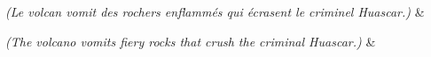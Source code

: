 \documentclass{article}
\newcommand{\stage}[1]{\hfill\emph{(#1)}\hfill}
\begin{document}
\begin{pairs}
\begin{Leftside}
	\stanza
		\stage{Le volcan vomit des rochers enflamm\'{e}s qui \'{e}crasent le criminel Huascar.}
    \& 
    \endnumbering
\end{Leftside}
\begin{Rightside}
	\stanza
		\stage{The volcano vomits fiery rocks that crush the criminal Huascar.}
    \& 
    \endnumbering
\end{Rightside} 
\Columns 
\end{pairs}

% 

\newpage
\end{document}
